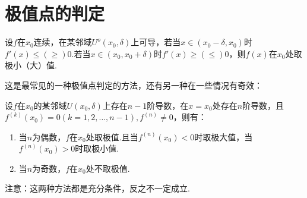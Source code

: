 \section{极值点的判定}

\begin{theorem}
	设$f$在$x_0$连续，在某邻域$U^o(x_0,\delta)$上可导，若当$x\in(x_0-\delta,x_0)$时$f'(x)\leq(\geq) 0$.若当$x\in (x_0,x_0+\delta)$时$f'(x)\geq(\leq) 0$，则$f(x)$在$x_0$处取极小（大）值.
\end{theorem}

这是最常见的一种极值点判定的方法，还有另一种在一些情况有奇效：

\begin{theorem}
	设$f$在$x_0$的某邻域$U(x_0,\delta)$上存在$n-1$阶导数，在$x=x_0$处存在$n$阶导数，且$f^{(k)}(x_0)=0(k=1,2,\dots,n-1),f^{(n)}\neq 0$，则有：
	\begin{enumerate}
		\item 当$n$为偶数，$f$在$x_0$处取极值.且当$f^{(n)}(x_0)<0$时取极大值，当$f^{(n)}(x_0)>0$时取极小值.
		\item 当$n$为奇数，$f$在$x_0$处不取极值.
	\end{enumerate}
\end{theorem}

注意：这两种方法都是充分条件，反之不一定成立.
